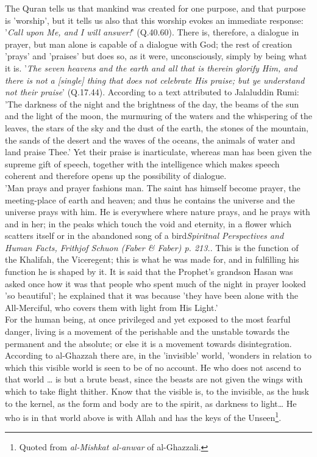 \documentclass[11pt, b5paper, twoside]{book}
\begin{document}
The Quran tells us that mankind was created for one purpose, and that purpose is 'worship', but it 
tells us also that this worship evokes an immediate response: '\emph{Call upon Me, and I will 
answer!}' (Q.40.60). There is, therefore, a dialogue in prayer, but man alone is capable of a dialogue 
with God; the rest of creation 'prays' and 'praises' but does so, as it were, unconsciously, simply 
by being what it is. '\emph{The seven heavens and the earth and all that is therein glorify Him, and there 
is not a [single] thing that does not celebrate His praise; but ye understand not their 
praise}' (Q.17.44). According to a text attributed to Jalaluddin Rumi: 'The darkness of the night and 
the brightness of the day, the beams of the sun and the light of the moon, the murmuring of the 
waters and the whispering of the leaves, the stars of the sky and the dust of the earth, the stones 
of the mountain, the sands of the desert and the waves of the oceans, the animals of water and land 
praise Thee.' Yet their praise is inarticulate, whereas man has been given the supreme gift of 
speech, together with the intelligence which makes speech coherent and therefore opens up the 
possibility of dialogue. \\

'Man prays and prayer fashions man. The saint has himself become prayer, the meeting-place of earth 
and heaven; and thus he contains the universe and the universe prays with him. He is everywhere where 
nature prays, and he prays with and in her; in the peaks which touch the void and eternity, in a 
flower which scatters itself or in the abandoned song of a bird\emph{\emph{Spiritnal Perspectives and Human Facts}, Frithjof Schuon (Faber \& Faber) p. 213.}. This is the function of the 
Khalifah, the Viceregent; this is what he was made for, and in fulfilling his function he is shaped 
by it. It is said that the Prophet's grandson Hasan was asked once how it was that people who spent 
much of the night in prayer looked 'so beautiful'; he explained that it was because 'they have been 
alone with the All-Merciful, who covers them with light from His Light.' \\

For the human being, at once privileged and yet exposed to the most fearful danger, living is a 
movement of the perishable and the unstable towards the permanent and the absolute; or else it is a 
movement towards disintegration. According to al-Ghazzah there are, in the 'invisible' world, 
'wonders in relation to which this visible world is seen to be of no account. He who does not ascend 
to that world \ldots{} is but a brute beast, since the beasts are not given the wings with which to take 
flight thither. Know that the visible is, to the invisible, as the husk to the kernel, as the form 
and body are to the spirit, as darkness to light\ldots{} He who is in that world above is with Allah and 
has the keys of the Unseen\footnote{Quoted from \emph{al-Mishkat al-anwar} of al-Ghazzali.}.\\
\end{document}

